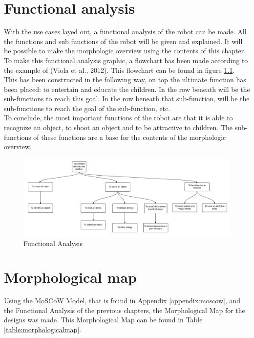 \documentclass[11pt,twoside,a4paper]{report}
\begin{document}
\chapter{Functional analysis}
With the use cases layed out, a functional analysis of the robot can be made. All the functions and sub functions of the robot will be given and explained. It will be possible to make the morphologic overview using the contents of this chapter. \\
To make this functional analysis graphic, a flowchart has been made according to the example of (Viola et al., 2012). This flowchart can be found in figure \ref{fig:FuncAnal}.\\
This has been constructed in the following way, on top the ultimate function has been placed: to entertain and educate the children. In the row beneath will be the sub-functions to reach this goal. In the row beneath that sub-function, will be the sub-functions to reach the goal of the sub-function, etc. \\
To conclude, the most important functions of the robot are that it is able to recognize an object, to shoot an object and to be attractive to children. The sub-functions of these functions are a base for the contents of the morphologic overview. 

\begin{figure}[h]
\begin{center}
\includegraphics[width = 17cm]{Images/FunctionalAnalysis.png}
\end{center}
\caption{Functional Analysis}
\label{fig:FuncAnal}
\end{figure}

\chapter{Morphological map}
Using the MoSCoW Model, that is found in Appendix \ref{appendix:moscow}, and the Functional Analysis of the previous chapters, the Morphological Map for the designs was made. This Morphological Map can be found in Table \ref{table:morphologicalmap}.
\end{document}
